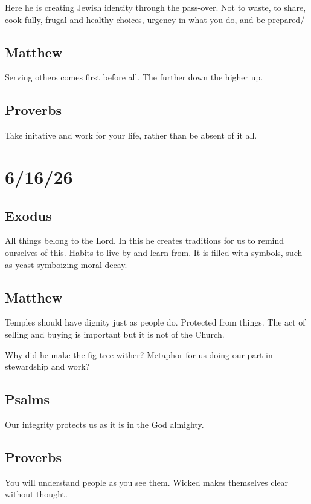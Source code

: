Here he is creating Jewish identity through the pass-over. Not to waste, to share, cook fully, frugal and healthy choices, urgency in what you do, and be prepared/

\subsection{Matthew}

Serving others comes first before all. The further down the higher up.

\subsection{Proverbs}

Take initative and work for your life, rather than be absent of it all.

\section{6/16/26}
\subsection{Exodus}

All things belong to the Lord. In this he creates traditions for us to remind ourselves of this. Habits to live by and learn from. It is filled with symbols, such as yeast symboizing moral decay.

\subsection{Matthew}

Temples should have dignity just as people do. Protected from things. The act of selling and buying is important but it is not of the Church.

Why did he make the fig tree wither? Metaphor for us doing our part in stewardship and work?

\subsection{Psalms}

Our integrity protects us as it is in the God almighty.

\subsection{Proverbs}
You will understand people as you see them. Wicked makes themselves clear without thought.


